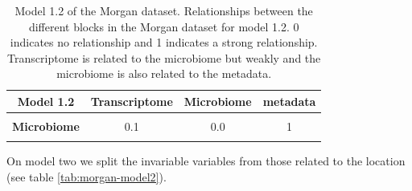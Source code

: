 \documentclass[
  12pt,
  a4paper,
  twoside,
  openright]{book}
\begin{document}
\begin{table}[H]

\caption[Model 1.2 of the Morgan dataset.]{\label{tab:morgan-model1-2}Model 1.2 of the Morgan dataset. Relationships between the different blocks in the Morgan dataset for model 1.2. 0 indicates no relationship and 1 indicates a strong relationship.  Transcriptome is related to the microbiome but weakly and the microbiome is also related to the metadata.}
\centering
\begin{tabular}[t]{>{}c|c|c|c}
\hline
\textbf{Model 1.2} & \textbf{Transcriptome} & \textbf{Microbiome} & \textbf{metadata}\\
\hline
\textbf{\cellcolor{gray!6}{Transcriptome}} & \cellcolor{gray!6}{0.0} & \cellcolor{gray!6}{0.1} & \cellcolor{gray!6}{0}\\
\hline
\textbf{Microbiome} & 0.1 & 0.0 & 1\\
\hline
\textbf{\cellcolor{gray!6}{metadata}} & \cellcolor{gray!6}{0.0} & \cellcolor{gray!6}{1.0} & \cellcolor{gray!6}{0}\\
\hline
\end{tabular}
\end{table}

On model two we split the invariable variables from those related to the location (see table \ref{tab:morgan-model2}).

\begin{table}[H]

\caption[Model 2 of the Morgan dataset.]{\label{tab:morgan-model2}Relationships between the different blocks in the Morgan dataset for model 2. 0 indicates no relationship and 1 indicates a strong relationship. Transcriptome and the microbiome are linked and related to demographic and location variables.}
\centering
{}
\end{table}
\end{document}
